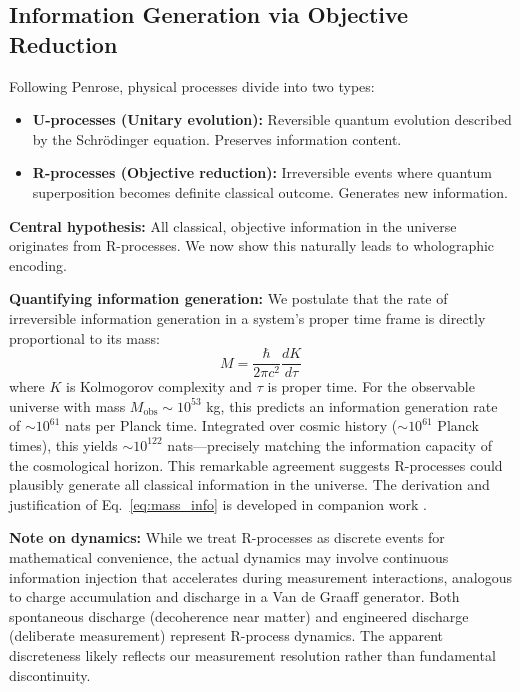 ﻿\documentclass[12pt]{article}
\begin{document}
\subsection{Information Generation via Objective Reduction}


Following Penrose, physical processes divide into two types:
\begin{itemize}
    \item \textbf{U-processes (Unitary evolution):} Reversible quantum evolution 
          described by the Schrödinger equation. Preserves information content.
    \item \textbf{R-processes (Objective reduction):} Irreversible events where 
          quantum superposition becomes definite classical outcome. Generates 
          new information.
\end{itemize}


\textbf{Central hypothesis:} All classical, objective information in the universe 
originates from R-processes. We now show this naturally leads to wholographic encoding.


\textbf{Quantifying information generation:} We postulate that the rate of 
irreversible information generation in a system's proper time frame is directly 
proportional to its mass:
\begin{equation}
M = \frac{\hbar}{2\pi c^2}\frac{dK}{d\tau}
\label{eq:mass_info}
\end{equation}
where $K$ is Kolmogorov complexity and $\tau$ is proper time. For the 
observable universe with mass $M_{\text{obs}} \sim 10^{53}$ kg, this predicts 
an information generation rate of $\sim 10^{61}$ nats per Planck time. 
Integrated over cosmic history ($\sim 10^{61}$ Planck times), this yields 
$\sim 10^{122}$ nats—precisely matching the information capacity of the 
cosmological horizon. This remarkable agreement suggests R-processes could 
plausibly generate all classical information in the universe. The derivation 
and justification of Eq.~\ref{eq:mass_info} is developed in companion work 
\cite{reilly_mass_info}.


\textbf{Note on dynamics:} While we treat R-processes as discrete events for 
mathematical convenience, the actual dynamics may involve continuous information 
injection that accelerates during measurement interactions, analogous to charge 
accumulation and discharge in a Van de Graaff generator. Both spontaneous 
discharge (decoherence near matter) and engineered discharge (deliberate 
measurement) represent R-process dynamics. The apparent discreteness likely 
reflects our measurement resolution rather than fundamental discontinuity.
\end{document}
